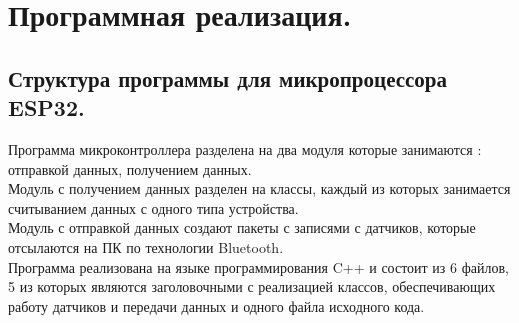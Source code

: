\documentclass[a4document]{article}
\begin{document}
{
\newpage
\section*{Программная реализация.} 

\subsection*{Структура программы для микропроцессора ESP32.}
Программа микроконтроллера разделена на два модуля которые занимаются : отправкой данных, получением данных.\\
Модуль с получением данных разделен на классы, каждый из которых занимается считыванием данных с одного
типа устройства.\\
Модуль с отправкой данных создают пакеты с записями с датчиков, которые отсылаются на ПК по технологии
Bluetooth. \\
Программа реализована на языке программирования C++ и состоит из 6 файлов, 5 из которых являются заголовочными 
с реализацией классов, обеспечивающих работу датчиков и передачи данных и одного файла исходного кода.

}
\end{document}
